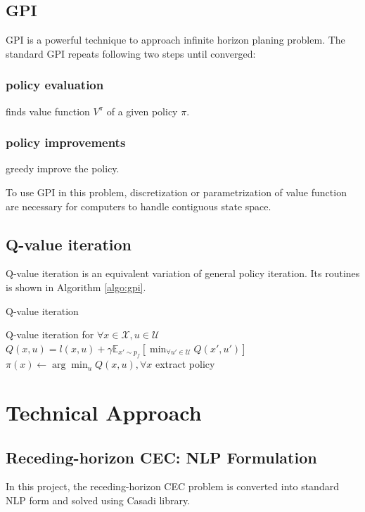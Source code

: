 \documentclass[conference]{IEEEtran}
\begin{document}
\subsection{GPI}
GPI is a powerful technique to approach 
infinite horizon planing problem.
The standard GPI repeats following two steps until converged:
\subsubsection{policy evaluation} finds value function $V^{\pi}$ of a given policy $\pi$.
\subsubsection{policy improvements} greedy improve the policy.

To use GPI in this problem, discretization or parametrization of value function 
are necessary for computers to handle contiguous state space.

\subsection{Q-value iteration}
Q-value iteration is an equivalent variation of general policy iteration.
Its routines is shown in Algorithm \ref{algo:gpi}.
\begin{algorithm}
    \caption{Q-value iteration}
    \label{algo:gpi}
    \begin{algorithmic}[1] %
        \Comment Q-value iteration
        \State for $\forall x \in \mathcal{X}, u \in \mathcal{U}$
        \State $Q(x,u) = l(x,u) + \gamma \mathbb{E}_{x'\sim p_f}\left[\min_{\forall u' \in \mathcal{U}} Q(x', u')\right]$
    \EndWhile
    \State $\pi(x) \leftarrow \arg\min_u Q(x, u), \forall x$
    \Comment extract policy
    \end{algorithmic}
\end{algorithm}


\section{Technical Approach}

\subsection{Receding-horizon CEC: NLP Formulation}
In this project, the receding-horizon CEC problem is converted into standard NLP form and solved using Casadi library.
\end{document}
